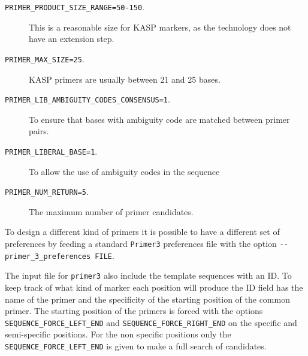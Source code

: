 \begin{description}
\item[\texttt{PRIMER\_PRODUCT\_SIZE\_RANGE=50-150}.] This is a reasonable size for KASP markers, as the technology does not have an extension step. 
\item[\texttt{PRIMER\_MAX\_SIZE=25}.] KASP primers are usually between 21 and 25 bases.
\item[\texttt{PRIMER\_LIB\_AMBIGUITY\_CODES\_CONSENSUS=1}.] To ensure that bases with ambiguity code are matched between primer pairs. 
\item[\texttt{PRIMER\_LIBERAL\_BASE=1}.] To allow the use of ambiguity codes in the sequence
\item[\texttt{PRIMER\_NUM\_RETURN=5}.] The maximum number of primer candidates. 
\end{description}
To design a different kind of primers it is possible to have a different set of preferences by feeding a standard \texttt{Primer3} preferences file with the option \verb|--primer_3_preferences FILE|. 

The input file for \verb|primer3| also include the template sequences with an ID. 
To keep track of what kind of marker each position will produce the ID field has the name of the primer and the specificity of the starting position of the common primer. 
The starting position of the primers is forced with the options \verb|SEQUENCE_FORCE_LEFT_END| and \verb|SEQUENCE_FORCE_RIGHT_END| on the specific and semi-specific positions. 
For the non specific positions only the \verb|SEQUENCE_FORCE_LEFT_END| is given to make a full search of candidates. 

